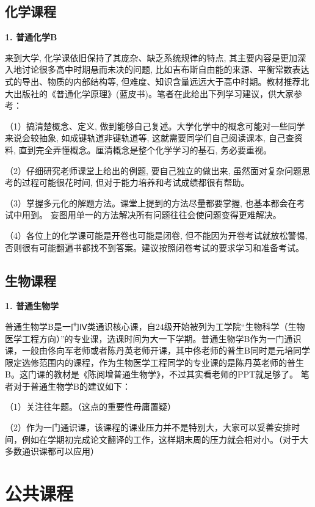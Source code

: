\documentclass[11pt,oneside]{book}
\begin{document}
\subsection{化学课程}

\textbf{1. 普通化学B}

来到大学, 化学课依旧保持了其庞杂、缺乏系统规律的特点, 其主要内容是更加深入地讨论很多高中时期悬而未决的问题, 比如吉布斯自由能的来源、平衡常数表达式的导出、物质的内部结构等, 但难度、知识含量远远大于高中时期。教材推荐北大出版社的《普通化学原理》(蓝皮书)。笔者在此给出下列学习建议，供大家参考：

（1）搞清楚概念、定义, 做到能够自己复述。大学化学中的概念可能对一些同学来说会较抽象, 如成键轨道非键轨道等, 这就需要同学们自己阅读课本, 自己查资料, 直到完全弄懂概念。厘清概念是整个化学学习的基石, 务必要重视。

（2）仔细研究老师课堂上给出的例题, 要自己独立的做出来, 虽然面对复杂问题思考的过程可能很花时间, 但对于能力培养和考试成绩都很有帮助。

（3）掌握多元化的解题方法。课堂上提到的方法尽量都要掌握, 也基本都会在考试中用到。 妄图用单一的方法解决所有问题往往会使问题变得更难解决。

（4）各位上的化学课可能是开卷也可能是闭卷, 但不能因为开卷考试就放松警惕, 否则很有可能翻遍书都找不到答案。建议按照闭卷考试的要求学习和准备考试。


\subsection{生物课程}

\textbf{1. 普通生物学}

普通生物学B是一门Ⅳ类通识核心课，自24级开始被列为工学院“生物科学（生物医学工程方向）”的专业课，选课时间为大一下学期。普通生物学B作为一门通识课，一般由佟向军老师或者陈丹英老师开课，其中佟老师的普生B同时是元培同学限定选修范围内的课程，作为生物医学工程同学的专业课的是陈丹英老师的普生B。这门课的教材是《陈阅增普通生物学》，不过其实看老师的PPT就足够了。
笔者对于普通生物学B的建议如下：

（1）关注往年题。（这点的重要性毋庸置疑）

（2）作为一门通识课，该课程的课业压力并不是特别大，大家可以妥善安排时间，例如在学期初完成论文翻译的工作，这样期末周的压力就会相对小。（对于大多数通识课都可以应用）


\section{公共课程}
\end{document}
